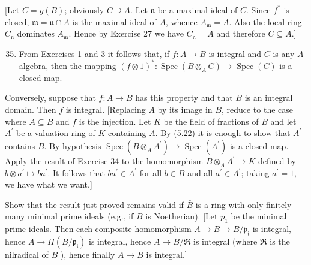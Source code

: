 \documentclass{standalone}
\theoremstyle{definition}
\theoremstyle{remark}
\begin{document}
[Let $C=g(B)$; obviously $C \supseteq A$. Let $\mathfrak{n}$ be a maximal ideal of $C$. Since $f^{*}$ is closed, $\mathfrak{m}=\mathfrak{n} \cap A$ is the maximal ideal of $A$, whence $A_{\mathfrak{m}}=A$. Also the local ring $C_{\mathfrak{n}}$ dominates $A_{\mathfrak{m}}$. Hence by Exercise 27 we have $C_{\mathfrak{n}}=A$ and therefore $C \subseteq A$.]

\begin{enumerate}
  \setcounter{enumi}{34}
  \item From Exercises 1 and 3 it follows that, if $f: A \rightarrow B$ is integral and $C$ is any $A$-algebra, then the mapping $(f \otimes 1)^{*}: \operatorname{Spec}\left(B \otimes_{A} C\right) \rightarrow \operatorname{Spec}(C)$ is a closed map.
\end{enumerate}

Conversely, suppose that $f: A \rightarrow B$ has this property and that $B$ is an integral domain. Then $f$ is integral. [Replacing $A$ by its image in $B$, reduce to the case where $A \subseteq B$ and $f$ is the injection. Let $K$ be the field of fractions of $B$ and let $A^{\prime}$ be a valuation ring of $K$ containing $A$. By (5.22) it is enough to show that $A^{\prime}$ contains $B$. By hypothesis $\operatorname{Spec}\left(B \otimes_{A} A^{\prime}\right) \rightarrow \operatorname{Spec}\left(A^{\prime}\right)$ is a closed map. Apply the result of Exercise 34 to the homomorphism $B \otimes_{A} A^{\prime} \rightarrow K$ defined by $b \otimes a^{\prime} \mapsto b a^{\prime}$. It follows that $b a^{\prime} \in A^{\prime}$ for all $b \in B$ and all $a^{\prime} \in A^{\prime}$; taking $a^{\prime}=1$, we have what we want.]

Show that the result just proved remains valid if $\bar{B}$ is a ring with only finitely many minimal prime ideals (e.g., if $B$ is Noetherian). [Let $p_{1}$ be the minimal prime ideals. Then each composite homomorphism $A \rightarrow B \rightarrow B / \mathfrak{p}_{\mathfrak{i}}$ is integral, hence $A \rightarrow \Pi\left(B / \mathfrak{p}_{\mathfrak{i}}\right)$ is integral, hence $A \rightarrow B / \mathfrak{R}$ is integral (where $\mathfrak{R}$ is the nilradical of $B$ ), hence finally $A \rightarrow B$ is integral.]
\end{document}
